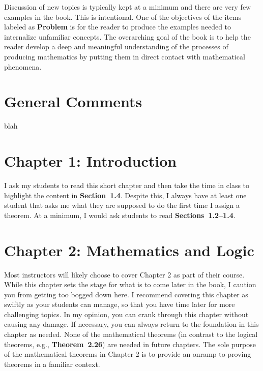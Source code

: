 \documentclass[11pt]{article}%
\newcommand{\blankline}{\pagebreak[2]\vspace{.5\baselineskip}}
\begin{document}
\blankline

Discussion of new topics is typically kept at a minimum and there are very few examples in the book. This is intentional.  One of the objectives of the items labeled as \textbf{Problem} is for the reader to produce the examples needed to internalize unfamiliar concepts.  The overarching goal of the book is to help the reader develop a deep and meaningful understanding of the processes of producing mathematics by putting them in direct contact with mathematical phenomena.


\section*{General Comments}

blah


\section*{Chapter 1: Introduction}

I ask my students to read this short chapter and then take the time in class to highlight the content in \textbf{Section~1.4}.  Despite this, I always have at least one student that asks me what they are supposed to do the first time I assign a theorem.  At a minimum, I would ask students to read \textbf{Sections~1.2--1.4}.


\section*{Chapter 2: Mathematics and Logic}


Most instructors will likely choose to cover Chapter 2 as part of their course.  While this chapter sets the stage for what is to come later in the book, I caution you from getting too bogged down here.  I recommend covering this chapter as swiftly as your students can manage, so that you have time later for more challenging topics.  In my opinion, you can crank through this chapter without causing any damage. If necessary, you can always return to the foundation in this chapter as needed. None of the mathematical theorems (in contrast to the logical theorems, e.g., \textbf{Theorem~2.26}) are needed in future chapters.  The sole purpose of the mathematical theorems in Chapter 2 is to provide an onramp to proving theorems in a familiar context.
\end{document}
